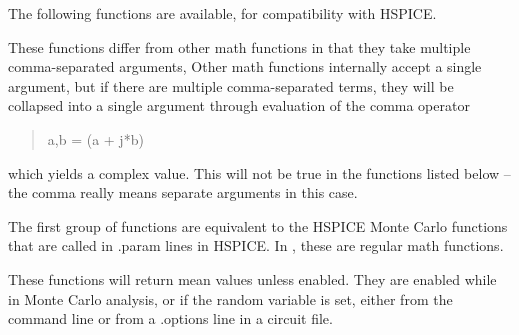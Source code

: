 
The following functions are available, for compatibility with HSPICE.

These functions differ from other math functions in that they take
multiple comma-separated arguments, Other math functions
internally accept a single argument, but if there are multiple
comma-separated terms, they will be collapsed into a single
argument through evaluation of the comma operator
\begin{quote}
\vt a,b = (a + j*b)
\end{quote}
which yields a complex value.  This will not be true in the functions
listed below -- the comma really means separate arguments in this
case.

The first group of functions are equivalent to the HSPICE Monte Carlo
functions that are called in {\vt .param} lines in HSPICE.  In
{\WRspice}, these are regular math functions.

These functions will return mean values unless enabled.  They are
enabled while in Monte Carlo analysis, or if the {\et random} variable
is set, either from the command line or from a {\vt .options} line in
a circuit file.

